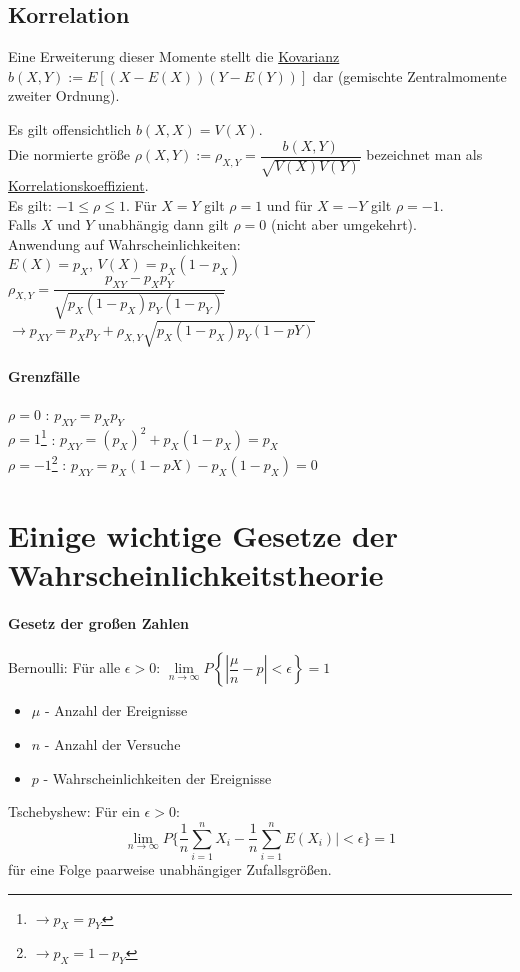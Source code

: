 \documentclass[10pt]{report}
\theoremstyle{definition}
\begin{document}
\subsection{Korrelation}
Eine Erweiterung dieser Momente stellt die \underline{Kovarianz}
$b(X,Y) := E\left[\left(X-E(X)\right) \left( Y-E(Y) \right)\right]$
dar (gemischte Zentralmomente zweiter Ordnung).

Es gilt offensichtlich $b(X,X) = V(X)$.\\
Die normierte größe $\rho(X,Y) := \rho_{X,Y} = \dfrac{b(X,Y)}{\sqrt{V(X)V(Y)}}$ bezeichnet man als \underline{Korrelationskoeffizient}. \\
Es gilt: $-1 \leq \rho \leq 1$. Für $X=Y$ gilt $\rho = 1$ und für $X=-Y$ gilt $\rho = -1$. \\
Falls $X$ und $Y$ unabhängig dann gilt $\rho = 0$ (nicht aber umgekehrt).\\
Anwendung auf Wahrscheinlichkeiten: \\
$E(X) = p_X$, $V(X) = p_X(1 - p_X)$ \\

$\rho_{X,Y} = \dfrac{p_{XY} - p_Xp_Y}{\sqrt{p_X(1-p_X) p_Y(1-p_Y)}}$
$\rightarrow p_{XY} = p_Xp_Y + \rho_{X,Y} \sqrt{p_X(1-p_X)p_Y(1-pY)}$

\paragraph{Grenzfälle}
$\rho = 0$ : $p_{XY} = p_X p_Y$\\
$\rho = 1$\footnote{$\rightarrow p_X = p_Y$} : $p_{XY} = (p_X)^2 + p_X(1-p_X) = p_X$\\
$\rho = -1$\footnote{$\rightarrow p_X = 1 - p_Y$} : $p_{XY} = p_X(1-pX) - p_X(1-p_X) = 0 $\\

\section{Einige wichtige Gesetze der Wahrscheinlichkeitstheorie}

\paragraph{Gesetz der großen Zahlen}
Bernoulli: Für alle $\epsilon > 0$: $\lim\limits_{n \rightarrow \infty}{P \left\lbrace| \dfrac{\mu}{n} - p | < \epsilon \right\rbrace} = 1$
\begin{itemize}
	\item $\mu$ - Anzahl der Ereignisse
	\item $n$ - Anzahl der Versuche
	\item $p$ - Wahrscheinlichkeiten der Ereignisse
\end{itemize}
Tschebyshew: Für ein $\epsilon >0$:
\[\lim\limits_{n \to \infty} P\{\frac{1}{n} \sum_{i=1}^{n} X_i - \frac{1}{n} \sum_{i=1}^{n} E(X_i)| < \epsilon \} = 1\] für eine Folge paarweise unabhängiger Zufallsgrößen.\\
\end{document}
